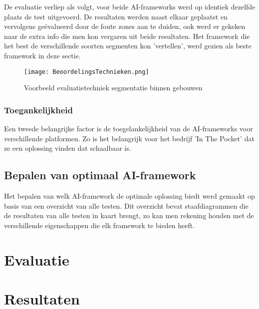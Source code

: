 De evaluatie verliep als volgt, voor beide AI-frameworks werd op identiek dezelfde plaats de test uitgevoerd. De resultaten werden naast elkaar geplaatst en vervolgens geëvalueerd door de foute zones aan te duiden, ook werd er gekeken naar de extra info die men kon vergaren uit beide resultaten. Het framework die het best de verschillende soorten segmenten kon 'vertellen', werd gezien als beste framework in deze sectie.

\begin{figure}[H]
	\centering
	\texttt{[image: BeoordelingsTechnieken.png]}
	\caption{Voorbeeld evaluatietechniek segmentatie binnen gebouwen}
\end{figure}

\subsubsection{Toegankelijkheid}
Een tweede belangrijke factor is de toegelankelijkheid van de AI-frameworks voor verschillende platformen. Zo is het belangrijk voor het bedrijf 'In The Pocket' dat ze een oplossing vinden dat schaalbaar is.

\subsection{Bepalen van optimaal AI-framework}
Het bepalen van welk AI-framework de optimale oplossing biedt werd gemaakt op basis van een overzicht van alle testen. Dit overzicht bevat staafdiagrammen die de resultaten van alle testen in kaart brengt, zo kan men rekening houden met de verschillende eigenschappen die elk framework te bieden heeft.

\section{Evaluatie}

\section{Resultaten}

